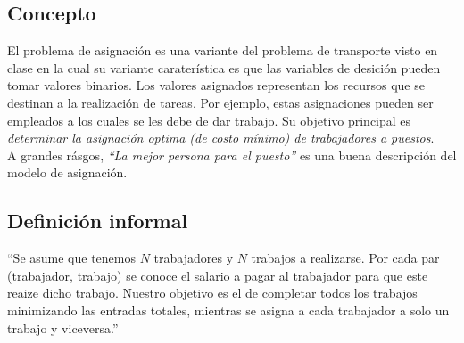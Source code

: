 \documentclass[letterpaper, 12pt]{article}
\begin{document}
    \subsection{Concepto}
    El problema de asignación es una variante del problema de transporte visto en clase en la cual su variante caraterística es que las variables de desición pueden tomar valores binarios.
    Los valores asignados representan los recursos que se destinan a la realización de tareas. Por ejemplo, estas asignaciones pueden ser empleados a los cuales se les debe de dar trabajo.
    Su objetivo principal es \emph{determinar la asignación optima (de costo mínimo) de trabajadores a puestos}.
    \\ \newline
    A grandes rásgos, \emph{``La mejor persona para el puesto''} es una buena descripción del modelo de asignación.
    \subsection{Definición informal}
    ``Se asume que tenemos \textbf{\(N\)} trabajadores y \textbf{\(N\)} trabajos a realizarse. Por cada par (trabajador, trabajo) se conoce el salario a pagar al trabajador para que este reaize dicho trabajo.
    Nuestro objetivo es el de completar todos los trabajos minimizando las entradas totales, mientras se asigna a cada trabajador a solo un trabajo y viceversa.''
\end{document}
